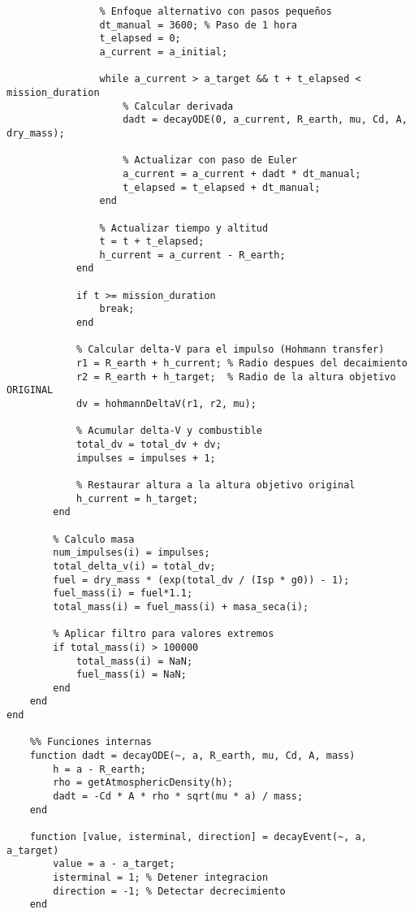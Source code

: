\begin{verbatim}
                % Enfoque alternativo con pasos pequeños
                dt_manual = 3600; % Paso de 1 hora
                t_elapsed = 0;
                a_current = a_initial;
                
                while a_current > a_target && t + t_elapsed < mission_duration
                    % Calcular derivada
                    dadt = decayODE(0, a_current, R_earth, mu, Cd, A, dry_mass);
                    
                    % Actualizar con paso de Euler
                    a_current = a_current + dadt * dt_manual;
                    t_elapsed = t_elapsed + dt_manual;
                end
                
                % Actualizar tiempo y altitud 
                t = t + t_elapsed;
                h_current = a_current - R_earth;
            end
            
            if t >= mission_duration
                break;
            end
            
            % Calcular delta-V para el impulso (Hohmann transfer)
            r1 = R_earth + h_current; % Radio despues del decaimiento
            r2 = R_earth + h_target;  % Radio de la altura objetivo ORIGINAL
            dv = hohmannDeltaV(r1, r2, mu);
            
            % Acumular delta-V y combustible
            total_dv = total_dv + dv;
            impulses = impulses + 1;
            
            % Restaurar altura a la altura objetivo original
            h_current = h_target;
        end
        
        % Calculo masa
        num_impulses(i) = impulses;
        total_delta_v(i) = total_dv;
        fuel = dry_mass * (exp(total_dv / (Isp * g0)) - 1);
        fuel_mass(i) = fuel*1.1;
        total_mass(i) = fuel_mass(i) + masa_seca(i);
        
        % Aplicar filtro para valores extremos
        if total_mass(i) > 100000
            total_mass(i) = NaN;
            fuel_mass(i) = NaN;
        end
    end
end
    
    %% Funciones internas
    function dadt = decayODE(~, a, R_earth, mu, Cd, A, mass)
        h = a - R_earth;
        rho = getAtmosphericDensity(h);
        dadt = -Cd * A * rho * sqrt(mu * a) / mass;
    end
    
    function [value, isterminal, direction] = decayEvent(~, a, a_target)
        value = a - a_target;
        isterminal = 1; % Detener integracion
        direction = -1; % Detectar decrecimiento
    end
    

\end{verbatim}
